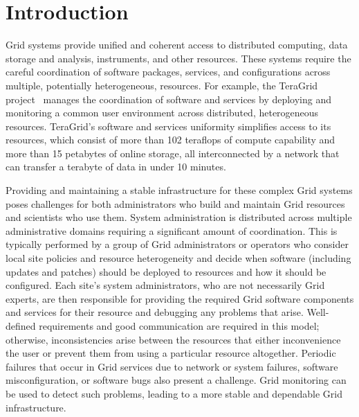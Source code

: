\documentclass{sig-alternate}
\begin{document}




\section{Introduction}
\label{intro}

Grid systems provide unified and coherent access to distributed computing,
data storage and analysis, instruments, and other resources.  These systems
require the careful coordination of software packages, services, and
configurations across multiple, potentially heterogeneous, resources.  For
example, the TeraGrid project~\cite{teragrid} manages the coordination of
software and services by deploying and monitoring a common user environment
across distributed, heterogeneous resources. 
TeraGrid's software and services uniformity simplifies access to its
resources, which consist of more than 102 teraflops of compute capability and
more than 15 petabytes of online storage, all interconnected by a network that
can transfer a terabyte of data in under 10 minutes.  

Providing and maintaining a stable infrastructure for these complex 
Grid systems poses challenges for both administrators who build and
maintain Grid resources and scientists who use them.  System
administration is distributed across multiple administrative domains 
requiring a significant amount of coordination.  This is typically performed by
a group of Grid administrators or operators who consider local site policies and
resource heterogeneity
and decide when software (including updates and patches) should be deployed to
resources and how it should be configured.  
Each site's system administrators, who are not necessarily Grid
experts, are then responsible for providing the required Grid software
components and services for their resource and debugging any problems that
arise.  Well-defined requirements and good communication are required in this
model; otherwise, inconsistencies arise between the resources that either
inconvenience the user or prevent them from using a particular resource
altogether.  Periodic failures that occur in Grid services due to network or
system failures, software misconfiguration, or software bugs also present a
challenge.  Grid monitoring can be used to detect such problems, leading to a
more stable and dependable Grid infrastructure.
\end{document}
